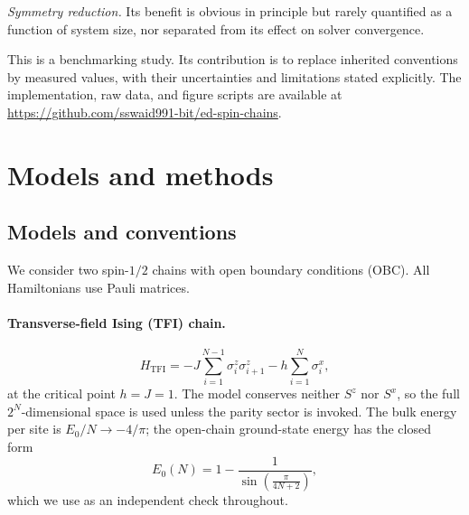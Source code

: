 \documentclass[pdflatex,sn-mathphys-num]{sn-jnl}
\begin{document}
\emph{Symmetry reduction.} Its benefit is obvious in principle but
rarely quantified as a function of system size, nor separated from
its effect on solver convergence.

This is a benchmarking study. Its contribution is to replace
inherited conventions by measured values, with their uncertainties
and limitations stated explicitly. The implementation, raw data, and
figure scripts are available at
\url{https://github.com/sswaid991-bit/ed-spin-chains}.

\section{Models and methods}
\label{sec:methods}

\subsection{Models and conventions}
\label{sec:models}

We consider two spin-$1/2$ chains with open boundary conditions
(OBC). All Hamiltonians use Pauli matrices.

\paragraph{Transverse-field Ising (TFI) chain.}
\begin{equation}
H_{\mathrm{TFI}} = -J \sum_{i=1}^{N-1} \sigma^z_i \sigma^z_{i+1}
                  - h \sum_{i=1}^{N} \sigma^x_i ,
\label{eq:tfi}
\end{equation}
at the critical point $h = J = 1$. The model conserves neither $S^z$
nor $S^x$, so the full $2^N$-dimensional space is used unless the
parity sector is invoked. The bulk energy per site is
$E_0/N \to -4/\pi$; the open-chain ground-state energy has the closed
form~\cite{Pfeuty1970}
\begin{equation}
E_0(N) = 1 - \frac{1}{\sin\!\left(\frac{\pi}{4N+2}\right)},
\label{eq:tfi-closed}
\end{equation}
which we use as an independent check throughout.
\end{document}
